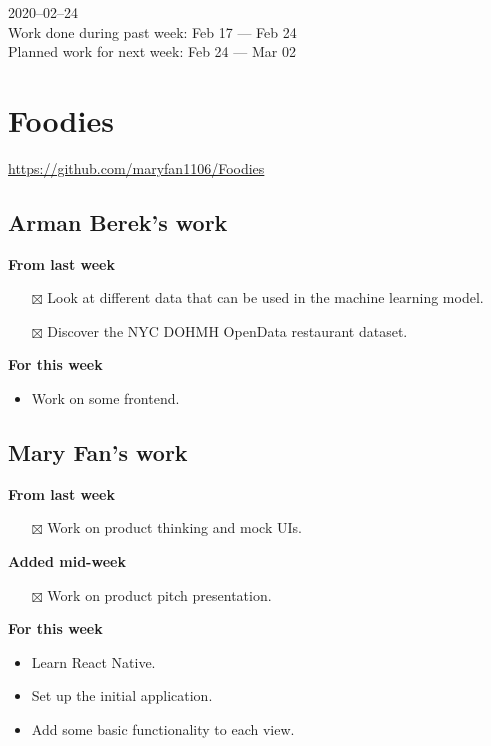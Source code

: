 \documentclass[12pt,letterpaper]{article}
\newcommand{\done}{$\boxtimes$}
\begin{document}
2020--02--24 \\
Work done during past week: Feb 17 --- Feb 24 \\
Planned work for next week: Feb 24 --- Mar 02

\section*{Foodies}
\url{https://github.com/maryfan1106/Foodies}

\subsection*{Arman Berek's work}

\textbf{From last week}
\begin{itemize}
  \item[\done] Look at different data that can be used in the machine learning model.
  \item[\done] Discover the NYC DOHMH OpenData restaurant dataset.
\end{itemize}


\textbf{For this week}
\begin{itemize}
  \item Work on some frontend.
\end{itemize}


\subsection*{Mary Fan's work}

\textbf{From last week}
\begin{itemize}
  \item[\done] Work on product thinking and mock UIs.
\end{itemize}

\textbf{Added mid-week}
\begin{itemize}
  \item[\done] Work on product pitch presentation.
\end{itemize}

\textbf{For this week}
\begin{itemize}
  \item Learn React Native.
  \item Set up the initial application.
  \item Add some basic functionality to each view.
\end{itemize}
\end{document}
